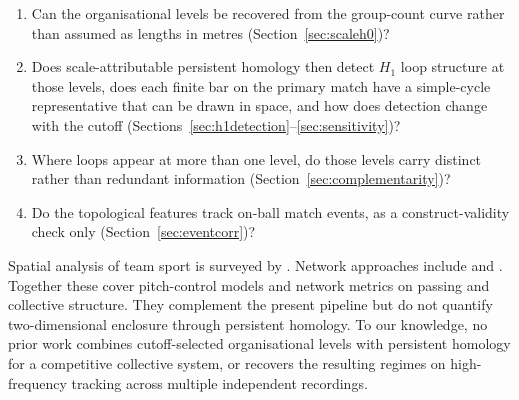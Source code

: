 \begin{enumerate}
\item\label{q:levels} Can the organisational levels be recovered from
the group-count curve rather than assumed as lengths in metres
(Section~\ref{sec:scaleh0})?
\item\label{q:homology} Does scale-attributable persistent homology
then detect \texorpdfstring{$H_1$}{} loop structure at those levels, does
each finite bar on the primary match have a simple-cycle representative
that can be drawn in space, and how does detection change with
the cutoff
(Sections~\ref{sec:h1detection}--\ref{sec:sensitivity})?
\item\label{q:distinct} Where loops appear at more than one level, do
those levels carry distinct rather than redundant information
(Section~\ref{sec:complementarity})?
\item\label{q:validity} Do the topological features track on-ball match
events, as a construct-validity check only
(Section~\ref{sec:eventcorr})?
\end{enumerate}

Spatial analysis of team sport is surveyed by
\citet{gudmundsson2017}. Network approaches include
\citet{grund2012} and \citet{buldu2018}.
Together these cover pitch-control models and network metrics on
passing and collective structure. They complement the present pipeline
but do not quantify two-dimensional enclosure through persistent
homology. To our knowledge, no prior work combines cutoff-selected
organisational levels with persistent homology for a competitive
collective system, or recovers the resulting regimes on high-frequency
tracking across multiple independent recordings.
